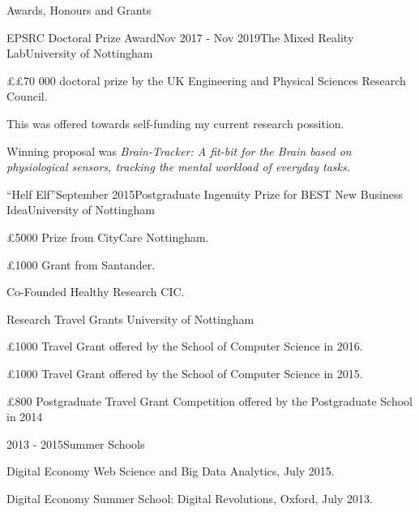 \documentclass{resume} %
\begin{document}
\begin{rSection}{Awards, Honours and Grants}
	  
	  \begin{rSubsection}{EPSRC Doctoral Prize Award}{Nov 2017 - Nov 2019}{The Mixed Reality Lab}{University of Nottingham }
		\item \pounds £70 000 doctoral prize by the UK Engineering and Physical Sciences Research Council.
		\item This was offered towards self-funding my current research possition.
		\item Winning proposal was \textit{Brain-Tracker: A fit-bit for the Brain based on physiological sensors, tracking the mental workload of everyday tasks.}
	\end{rSubsection}


    \begin{rSubsection}{``Helf Elf''}{September 2015}{Postgraduate Ingenuity Prize for BEST New Business Idea}{University of Nottingham}
        \item \pounds 5000 Prize from CityCare Nottingham.
        \item \pounds 1000 Grant from Santander.
        \item Co-Founded Healthy Research CIC.
    \end{rSubsection}
\vspace{-4mm}
    \begin{rSubsection}{}{}{Research Travel Grants}{ University of Nottingham}
        \item \pounds 1000 Travel Grant offered by the School of Computer Science in 2016.
        \item \pounds 1000 Travel Grant offered by the School of Computer Science in 2015.
        \item \pounds 800 Postgraduate Travel Grant Competition offered by the Postgraduate School in 2014
    \end{rSubsection}
\vspace{-4 mm}
    \begin{rSubsection}{}{2013 - 2015}{Summer Schools}{}
        \item Digital Economy Web Science and Big Data Analytics, July 2015.
        \item Digital Economy Summer School: Digital Revolutions, Oxford, July 2013.
    \end{rSubsection}


\end{rSection}
\end{document}
